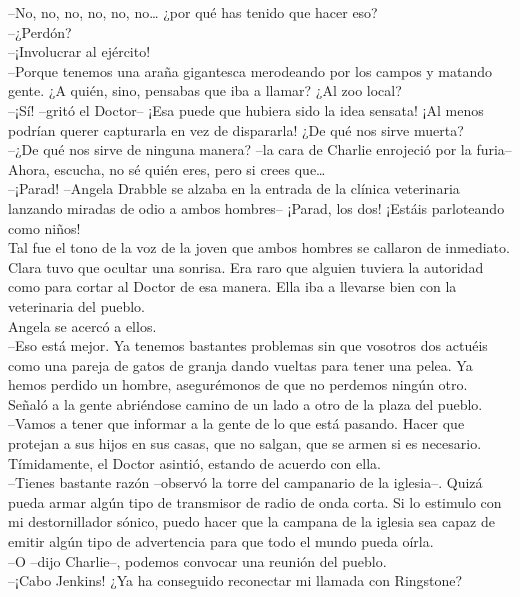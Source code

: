 --No, no, no, no, no, no\ldots{} ¿por qué has tenido que hacer eso?\\
--¿Perdón?\\
--¡Involucrar al ejército!\\
--Porque tenemos una araña gigantesca merodeando por los campos y
matando gente. ¿A quién, sino, pensabas que iba a llamar? ¿Al zoo
local?\\
--¡Sí! --gritó el Doctor-- ¡Esa puede que hubiera sido la idea sensata!
¡Al menos podrían querer capturarla en vez de dispararla! ¿De qué nos
sirve muerta?\\
--¿De qué nos sirve de ninguna manera? --la cara de Charlie enrojeció
por la furia-- Ahora, escucha, no sé quién eres, pero si crees
que\ldots{}\\
--¡Parad! --Angela Drabble se alzaba en la entrada de la clínica
veterinaria lanzando miradas de odio a ambos hombres-- ¡Parad, los dos!
¡Estáis parloteando como niños!\\
Tal fue el tono de la voz de la joven que ambos hombres se callaron de
inmediato. Clara tuvo que ocultar una sonrisa. Era raro que alguien
tuviera la autoridad como para cortar al Doctor de esa manera. Ella iba
a llevarse bien con la veterinaria del pueblo.\\
Angela se acercó a ellos.\\
--Eso está mejor. Ya tenemos bastantes problemas sin que vosotros dos
actuéis como una pareja de gatos de granja dando vueltas para tener una
pelea. Ya hemos perdido un hombre, asegurémonos de que no perdemos
ningún otro.\\
Señaló a la gente abriéndose camino de un lado a otro de la plaza del
pueblo.\\
--Vamos a tener que informar a la gente de lo que está pasando. Hacer
que protejan a sus hijos en sus casas, que no salgan, que se armen si es
necesario.\\
Tímidamente, el Doctor asintió, estando de acuerdo con ella.\\
--Tienes bastante razón --observó la torre del campanario de la
iglesia--. Quizá pueda armar algún tipo de transmisor de radio de onda
corta. Si lo estimulo con mi destornillador sónico, puedo hacer que la
campana de la iglesia sea capaz de emitir algún tipo de advertencia para
que todo el mundo pueda oírla.\\
--O --dijo Charlie--, podemos convocar una reunión del
pueblo.\\[2\baselineskip]--¡Cabo Jenkins! ¿Ya ha conseguido reconectar
mi llamada con Ringstone?\\
